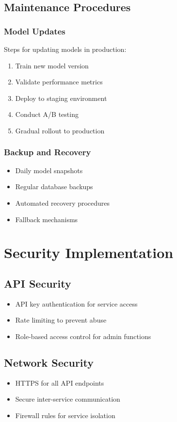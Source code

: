 \documentclass[12pt,a4paper]{report}
\begin{document}
\subsection{Maintenance Procedures}
\subsubsection{Model Updates}
Steps for updating models in production:
\begin{enumerate}
    \item Train new model version
    \item Validate performance metrics
    \item Deploy to staging environment
    \item Conduct A/B testing
    \item Gradual rollout to production
\end{enumerate}

\subsubsection{Backup and Recovery}
\begin{itemize}
    \item Daily model snapshots
    \item Regular database backups
    \item Automated recovery procedures
    \item Fallback mechanisms
\end{itemize}

\section{Security Implementation}
\subsection{API Security}
\begin{itemize}
    \item API key authentication for service access
    \item Rate limiting to prevent abuse
    \item Role-based access control for admin functions
\end{itemize}

\subsection{Network Security}
\begin{itemize}
    \item HTTPS for all API endpoints
    \item Secure inter-service communication
    \item Firewall rules for service isolation
\end{itemize}
\end{document}
